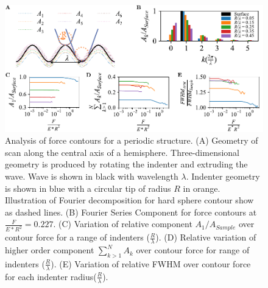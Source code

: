 \begin{figure}[htp]
    \centering
    \includegraphics[width=\linewidth]{Figures/Figure5.pdf} 
    \caption{\label{fig: Wave FWHM/Fourier Plot}Analysis of force contours for a periodic structure. (A) Geometry of scan along the central axis of a hemisphere. Three-dimensional geometry is produced by rotating the indenter and extruding the wave. Wave is shown in black with wavelength $\lambda$. Indenter geometry is shown in blue with a circular tip of radius $R$ in orange. Illustration of Fourier decomposition for hard sphere contour show as dashed lines. (B) Fourier Series Component for force contours at $\frac{F}{E*R^2} = 0.227$. (C) Variation of relative component $A_1/A_{Sample}$ over contour force for a range of indenters ($\frac{R}{\lambda}$). (D) Relative variation of higher order component $\sum^N_{k>1} A_k$ over contour force for range of indenters ($\frac{R}{\lambda}$). (E) Variation of relative FWHM over contour force for each indenter radius($\frac{R}{\lambda}$).}  
\end{figure}